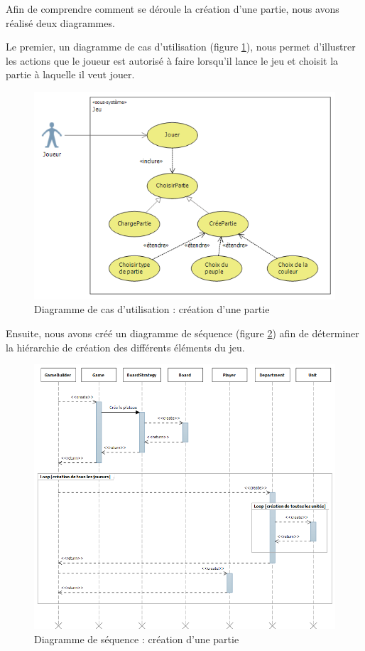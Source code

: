 Afin de comprendre comment se déroule la création d'une partie, nous avons réalisé deux diagrammes.

Le premier, un diagramme de cas d'utilisation (figure \ref{fig:cdu_CreationPartie}), nous permet d'illustrer les actions que le joueur est autorisé à faire lorsqu'il lance le jeu et choisit la partie à laquelle il veut jouer.
\begin{figure}[!h]
\centering
\includegraphics[width=\textwidth]{Parties/Images/cdu_CreationPartie.png}
\caption{Diagramme de cas d'utilisation : création d'une partie}
\label{fig:cdu_CreationPartie}
\end{figure}

\newpage
Ensuite, nous avons créé un diagramme de séquence (figure \ref{fig:seq_CreationPartie}) afin de déterminer la hiérarchie de création des différents éléments du jeu.
\begin{figure}[!h]
\centering
\includegraphics[width=\textwidth]{Parties/Images/seq_CreationPartie.png}
\caption{Diagramme de séquence : création d'une partie}
\label{fig:seq_CreationPartie}
\end{figure}
